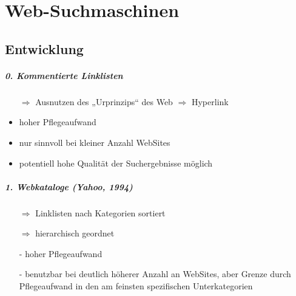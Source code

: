 \chapter{Web-Suchmaschinen}


\section{Entwicklung}

\paragraph{0. Kommentierte Linklisten}\hspace*{1mm}
\begin{itemize}
\item[$\Rightarrow$] Ausnutzen des „Urprinzips“ des Web $\Rightarrow$ Hyperlink
\item hoher Pflegeaufwand
\item nur sinnvoll bei kleiner Anzahl WebSites
\item potentiell hohe Qualität der Suchergebnisse möglich
\end{itemize}

\paragraph{1. Webkataloge (Yahoo, 1994)}\hspace*{1mm}
\begin{itemize}
\item[$\Rightarrow$] Linklisten nach Kategorien sortiert
\item[$\Rightarrow$] hierarchisch geordnet
\item[-] hoher Pflegeaufwand
\item[-] benutzbar bei deutlich höherer Anzahl an WebSites, aber Grenze durch Pflegeaufwand in den am feinsten spezifischen Unterkategorien
\end{itemize}

